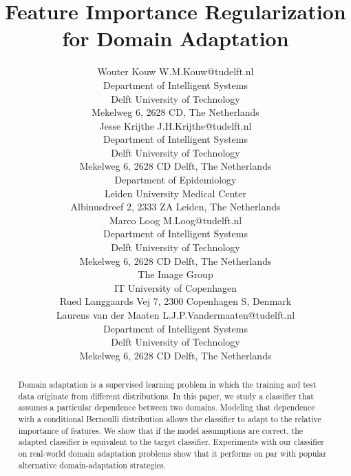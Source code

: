\documentclass[twoside,11pt]{article}
\begin{document}
\title{Feature Importance Regularization \\ for Domain Adaptation}

\author{\name Wouter Kouw \email W.M.Kouw@tudelft.nl \\
       \addr Department of Intelligent Systems\\
       Delft University of Technology\\
       Mekelweg 6, 2628 CD, The Netherlands \\
       \AND
       \name Jesse Krijthe \email J.H.Krijthe@tudelft.nl \\
       \addr Department of Intelligent Systems\\
       Delft University of Technology\\
       Mekelweg 6, 2628 CD Delft, The Netherlands \\
       \addr Department of Epidemiology \\
       Leiden University Medical Center \\
       Albinusdreef 2, 2333 ZA Leiden, The Netherlands \\
       \AND
       \name Marco Loog \email M.Loog@tudelft.nl \\
       \addr Department of Intelligent Systems\\
       Delft University of Technology\\
       Mekelweg 6, 2628 CD Delft, The Netherlands \\
       \addr The Image Group \\
	IT University of Copenhagen \\
	Rued Langgaards Vej 7, 2300 Copenhagen S, Denmark \\
       \AND
       \name Laurens van der Maaten \email L.J.P.Vandermaaten@tudelft.nl \\
       \addr Department of Intelligent Systems\\
       Delft University of Technology\\
       Mekelweg 6, 2628 CD Delft, The Netherlands
}


\maketitle

\begin{abstract}%
Domain adaptation is a supervised learning problem in which the training and test data originate from different distributions. In this paper, we study a classifier that assumes a particular dependence between two domains. Modeling that dependence with a conditional Bernoulli	 distribution allows the classifier to adapt to the relative importance of features. We show that if the model assumptions are correct, the adapted classifier is equivalent to the target classifier. Experiments with our classifier on real-world domain adaptation problems show that it performs on par with popular alternative domain-adaptation strategies.
\end{abstract}
\end{document}
